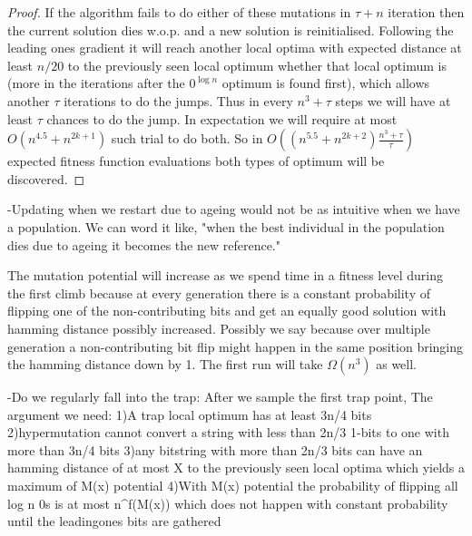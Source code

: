 \documentclass[lettersize,journal]{IEEEtran}
\begin{document}
{\begin{proof}
	 If the algorithm fails to do either of these mutations in $\tau + n$ iteration then the current solution dies w.o.p. and a new solution is reinitialised. Following the leading ones gradient it will reach another local optima with expected distance at least $n/20$ to the previously seen local optimum whether that local optimum is  (more in the iterations after the $0^{\log n}$ optimum is found first), which allows another $\tau$ iterations to do the jumps. Thus in every $n^3+\tau$ steps we will have at least $\tau$ chances to do the jump. In expectation we will require at most $O(n^{4.5} + n^{2k+1})$ such trial to do both. So in $O\left(\left(n^{5.5} + n^{2k+2}\right) \frac{n^3+\tau}{\tau}\right)$ expected fitness function evaluations both types of optimum will be discovered.
	 

 	

\end{proof} 

	 	-Updating when we restart due to ageing would not be as intuitive when we have a population. We can word it like, "when the best individual in the population dies due to ageing it becomes the new reference."
	 	
	 	The mutation potential will increase as we spend time in a fitness level during the first climb because at every generation there is a constant probability of flipping one of the non-contributing bits and get an equally good solution with hamming distance possibly increased. Possibly we say because over multiple generation a non-contributing bit flip might happen in the same position bringing the hamming distance down by 1. 
	 	The first run will take $\Omega(n^3)$ as well. 


		-Do we regularly fall into the trap: After we sample the first trap point, The argument we need:
		1)A trap local optimum has at least 3n/4 bits
		2)hypermutation cannot convert a string with less than 2n/3 1-bits to one with more than 3n/4 bits 
		3)any bitstring with more than 2n/3 bits can have an hamming distance of at most X to the previously seen local optima which yields a maximum of M(x) potential
		4)With M(x) potential the probability of flipping all log n 0s is at most n^{f(M(x))} which does not happen with constant probability until the leadingones bits are gathered 

}
\end{document}
